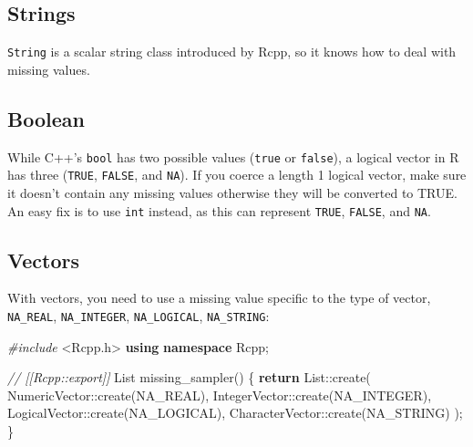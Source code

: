 \documentclass[]{book}
\newenvironment{Shaded}{\begin{snugshade}}{\end{snugshade}}
\newcommand{\CommentTok}[1]{\textcolor[rgb]{0.37,0.37,0.37}{\textit{#1}}}
\newcommand{\ControlFlowTok}[1]{\textcolor[rgb]{0.27,0.27,0.27}{\textbf{#1}}}
\newcommand{\ImportTok}[1]{#1}
\newcommand{\KeywordTok}[1]{\textcolor[rgb]{0.27,0.27,0.27}{\textbf{#1}}}
\newcommand{\NormalTok}[1]{#1}
\newcommand{\PreprocessorTok}[1]{\textcolor[rgb]{0.37,0.37,0.37}{\textit{#1}}}
\begin{document}
\hypertarget{strings}{%
\subsection{Strings}\label{strings}}

\texttt{String} is a scalar string class introduced by Rcpp, so it knows how to deal with missing values.

\hypertarget{boolean}{%
\subsection{Boolean}\label{boolean}}

While C++'s \texttt{bool} has two possible values (\texttt{true} or \texttt{false}), a logical vector in R has three (\texttt{TRUE}, \texttt{FALSE}, and \texttt{NA}). If you coerce a length 1 logical vector, make sure it doesn't contain any missing values otherwise they will be converted to TRUE. An easy fix is to use \texttt{int} instead, as this can represent \texttt{TRUE}, \texttt{FALSE}, and \texttt{NA}.

\hypertarget{vectors-rcpp}{%
\subsection{Vectors}\label{vectors-rcpp}}

With vectors, you need to use a missing value specific to the type of vector, \texttt{NA\_REAL}, \texttt{NA\_INTEGER}, \texttt{NA\_LOGICAL}, \texttt{NA\_STRING}:

\begin{Shaded}
\begin{Highlighting}[]
\PreprocessorTok{#include }\ImportTok{<Rcpp.h>}
\KeywordTok{using} \KeywordTok{namespace}\NormalTok{ Rcpp;}

\CommentTok{// [[Rcpp::export]]}
\NormalTok{List missing_sampler() \{}
  \ControlFlowTok{return}\NormalTok{ List::create(}
\NormalTok{    NumericVector::create(NA_REAL),}
\NormalTok{    IntegerVector::create(NA_INTEGER),}
\NormalTok{    LogicalVector::create(NA_LOGICAL),}
\NormalTok{    CharacterVector::create(NA_STRING)}
\NormalTok{  );}
\NormalTok{\}}
\end{Highlighting}
\end{Shaded}

\begin{Shaded}
\end{Shaded}
\end{document}
